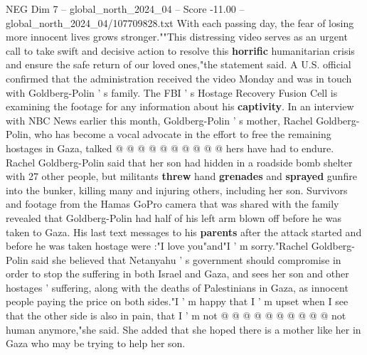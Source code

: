 \begin{textsample}{NEG Dim 7 – global\_north\_2024\_04 – Score -11.00 – global\_north\_2024\_04/107709828.txt}
With each passing day, the fear of losing more innocent lives grows stronger.""This distressing video serves as an urgent call to take swift and decisive action to resolve this \textbf{horrific} humanitarian crisis and ensure the safe return of our loved ones,"the statement said.
A U.S. official confirmed that the administration received the video Monday and was in touch with Goldberg-Polin ' s family.
The FBI ' s Hostage Recovery Fusion Cell is examining the footage for any information about his \textbf{captivity}.
In an interview with NBC News earlier this month, Goldberg-Polin ' s mother, Rachel Goldberg-Polin, who has become a vocal advocate in the effort to free the remaining hostages in Gaza, talked @ @ @ @ @ @ @ @ @ @ hers have had to endure.
Rachel Goldberg-Polin said that her son had hidden in a roadside bomb shelter with 27 other people, but militants \textbf{threw} hand \textbf{grenades} and \textbf{sprayed} gunfire into the bunker, killing many and injuring others, including her son.
Survivors and footage from the Hamas GoPro camera that was shared with the family revealed that Goldberg-Polin had half of his left arm blown off before he was taken to Gaza.
His last text messages to his \textbf{parents} after the attack started and before he was taken hostage were :"I love you"and"I ' m sorry."Rachel Goldberg-Polin said she believed that Netanyahu ' s government should compromise in order to stop the suffering in both Israel and Gaza, and sees her son and other hostages ' suffering, along with the deaths of Palestinians in Gaza, as innocent people paying the price on both sides."I ' m happy that I ' m upset when I see that the other side is also in pain, that I ' m not @ @ @ @ @ @ @ @ @ @ not human anymore,"she said.
She added that she hoped there is a mother like her in Gaza who may be trying to help her son.

\end{textsample}
